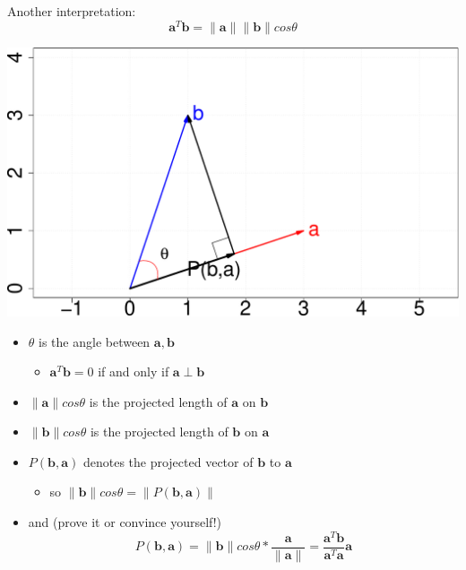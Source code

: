 \documentclass[ignorenonframetext,]{beamer}
\providecommand{\tightlist}{%
  \setlength{\itemsep}{0pt}\setlength{\parskip}{0pt}}
\newcommand{\vv}[1]{\boldsymbol{#1}}
\begin{document}
\begin{frame}

Another interpretation:
\[\vv{a}^T \vv{b} = \|\vv{a}\| \|\vv{b}\|cos \theta\]

\begin{center}\includegraphics[width=0.5\linewidth]{math4ml_files/figure-beamer/unnamed-chunk-5-1} \end{center}

\begin{itemize}
\tightlist
\item
  \(\theta\) is the angle between \(\vv{a}, \vv{b}\)

  \begin{itemize}
  \tightlist
  \item
    \(\vv{a}^T\vv{b}=0\) if and only if \(\vv{a} \perp \vv{b}\)
  \end{itemize}
\item
  \(\|\vv{a}\|cos \theta\) is the projected length of \(\vv{a}\) on
  \(\vv{b}\)
\item
  \(\|\vv{b}\|cos \theta\) is the projected length of \(\vv{b}\) on
  \(\vv{a}\)
\item
  \(P(\vv{b}, \vv{a})\) denotes the projected vector of \(\vv{b}\) to
  \(\vv{a}\)

  \begin{itemize}
  \tightlist
  \item
    so \(\|\vv{b}\|cos \theta = \|P(\vv{b}, \vv{a})\|\)
  \end{itemize}
\item
  and (prove it or convince yourself!)
  \[P(\vv{b}, \vv{a}) = \|\vv{b}\|cos \theta * \frac{\vv{a}}{\|\vv{a}\|} =  \frac{\vv{a}^T\vv{b}}{\vv{a}^T\vv{a}}  \vv{a}\]
\end{itemize}

\end{frame}
\end{document}
